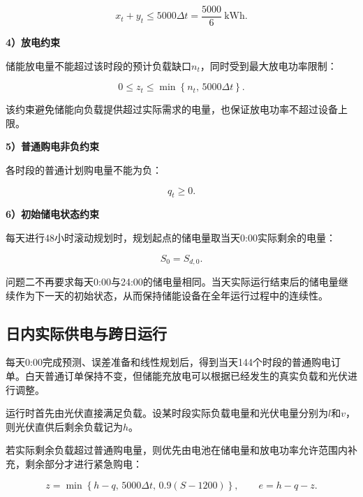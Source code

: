 \begin{equation}
x_t+y_t
\leq
5000\Delta t
=
\frac{5000}{6}\ \mathrm{kWh}.
\label{eq:q2_charge_limit}
\end{equation}


\textbf{4）放电约束}

储能放电量不能超过该时段的预计负载缺口$n_t$，同时受到最大放电功率限制：

\begin{equation}
0
\leq
z_t
\leq
\min
\left\{
n_t,\,
5000\Delta t
\right\}.
\label{eq:q2_discharge_limit}
\end{equation}

该约束避免储能向负载提供超过实际需求的电量，也保证放电功率不超过设备上限。


\textbf{5）普通购电非负约束}

各时段的普通计划购电量不能为负：

\begin{equation}
q_t\geq0.
\label{eq:q2_purchase_nonnegative}
\end{equation}


\textbf{6）初始储电状态约束}

每天进行48小时滚动规划时，规划起点的储电量取当天0:00实际剩余的电量：

\begin{equation}
S_0=S_{d,0}.
\label{eq:q2_initial_soc}
\end{equation}

问题二不再要求每天0:00与24:00的储电量相同。当天实际运行结束后的储电量继续作为下一天的初始状态，从而保持储能设备在全年运行过程中的连续性。


\subsection{日内实际供电与跨日运行}

每天0:00完成预测、误差准备和线性规划后，得到当天144个时段的普通购电订单。白天普通订单保持不变，但储能充放电可以根据已经发生的真实负载和光伏进行调整。

运行时首先由光伏直接满足负载。设某时段实际负载电量和光伏电量分别为$l$和$v$，则光伏直供后剩余负载记为$h$。

若实际剩余负载超过普通购电量，则优先由电池在储电量和放电功率允许范围内补充，剩余部分才进行紧急购电：

\begin{equation}
z
=
\min
\left\{
h-q,\,
5000\Delta t,\,
0.9(S-1200)
\right\},
\qquad
e=h-q-z.
\label{eq:q2_emergency}
\end{equation}

